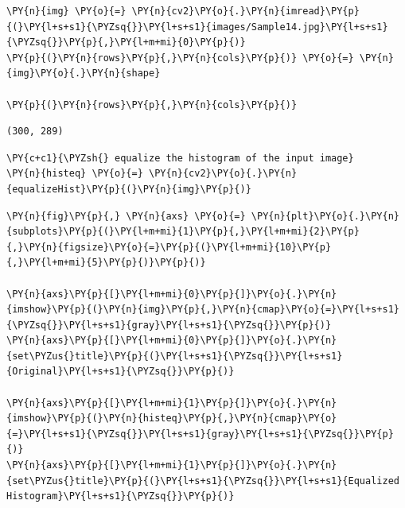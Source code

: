 \begin{tcolorbox}[breakable, size=fbox, boxrule=1pt, pad at break*=1mm,colback=cellbackground, colframe=cellborder]
	\begin{Verbatim}[commandchars=\\\{\}]
\PY{n}{img} \PY{o}{=} \PY{n}{cv2}\PY{o}{.}\PY{n}{imread}\PY{p}{(}\PY{l+s+s1}{\PYZsq{}}\PY{l+s+s1}{images/Sample14.jpg}\PY{l+s+s1}{\PYZsq{}}\PY{p}{,}\PY{l+m+mi}{0}\PY{p}{)}
\PY{p}{(}\PY{n}{rows}\PY{p}{,}\PY{n}{cols}\PY{p}{)} \PY{o}{=} \PY{n}{img}\PY{o}{.}\PY{n}{shape}

\PY{p}{(}\PY{n}{rows}\PY{p}{,}\PY{n}{cols}\PY{p}{)}
	\end{Verbatim}
\end{tcolorbox}

\begin{tcolorbox}[breakable, size=fbox, boxrule=.5pt, pad at break*=1mm, opacityfill=0]
	\begin{Verbatim}[commandchars=\\\{\}]
(300, 289)
	\end{Verbatim}
\end{tcolorbox}

\begin{tcolorbox}[breakable, size=fbox, boxrule=1pt, pad at break*=1mm,colback=cellbackground, colframe=cellborder]
	\begin{Verbatim}[commandchars=\\\{\}]
\PY{c+c1}{\PYZsh{} equalize the histogram of the input image}
\PY{n}{histeq} \PY{o}{=} \PY{n}{cv2}\PY{o}{.}\PY{n}{equalizeHist}\PY{p}{(}\PY{n}{img}\PY{p}{)}
	\end{Verbatim}
\end{tcolorbox}

\begin{tcolorbox}[breakable, size=fbox, boxrule=1pt, pad at break*=1mm,colback=cellbackground, colframe=cellborder]
	\begin{Verbatim}[commandchars=\\\{\}]
\PY{n}{fig}\PY{p}{,} \PY{n}{axs} \PY{o}{=} \PY{n}{plt}\PY{o}{.}\PY{n}{subplots}\PY{p}{(}\PY{l+m+mi}{1}\PY{p}{,}\PY{l+m+mi}{2}\PY{p}{,}\PY{n}{figsize}\PY{o}{=}\PY{p}{(}\PY{l+m+mi}{10}\PY{p}{,}\PY{l+m+mi}{5}\PY{p}{)}\PY{p}{)}

\PY{n}{axs}\PY{p}{[}\PY{l+m+mi}{0}\PY{p}{]}\PY{o}{.}\PY{n}{imshow}\PY{p}{(}\PY{n}{img}\PY{p}{,}\PY{n}{cmap}\PY{o}{=}\PY{l+s+s1}{\PYZsq{}}\PY{l+s+s1}{gray}\PY{l+s+s1}{\PYZsq{}}\PY{p}{)}
\PY{n}{axs}\PY{p}{[}\PY{l+m+mi}{0}\PY{p}{]}\PY{o}{.}\PY{n}{set\PYZus{}title}\PY{p}{(}\PY{l+s+s1}{\PYZsq{}}\PY{l+s+s1}{Original}\PY{l+s+s1}{\PYZsq{}}\PY{p}{)}

\PY{n}{axs}\PY{p}{[}\PY{l+m+mi}{1}\PY{p}{]}\PY{o}{.}\PY{n}{imshow}\PY{p}{(}\PY{n}{histeq}\PY{p}{,}\PY{n}{cmap}\PY{o}{=}\PY{l+s+s1}{\PYZsq{}}\PY{l+s+s1}{gray}\PY{l+s+s1}{\PYZsq{}}\PY{p}{)}
\PY{n}{axs}\PY{p}{[}\PY{l+m+mi}{1}\PY{p}{]}\PY{o}{.}\PY{n}{set\PYZus{}title}\PY{p}{(}\PY{l+s+s1}{\PYZsq{}}\PY{l+s+s1}{Equalized Histogram}\PY{l+s+s1}{\PYZsq{}}\PY{p}{)}
	\end{Verbatim}
\end{tcolorbox}

